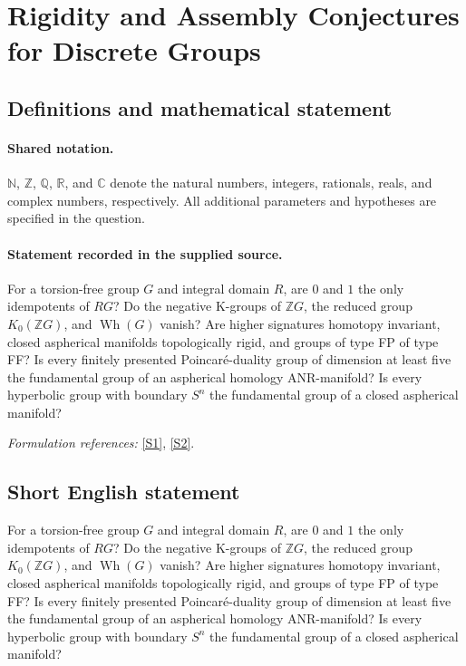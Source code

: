 \documentclass[11pt]{article}
\newcommand{\sref}[2]{\hyperlink{source:#1:#2}{[S#2]}}
\begin{document}
\section{Rigidity and Assembly Conjectures for Discrete Groups}\label{statement}

\subsection{Definitions and mathematical statement}

\paragraph{Shared notation.}$\mathbb N$, $\mathbb Z$, $\mathbb Q$, $\mathbb R$, and $\mathbb C$ denote the natural numbers, integers, rationals, reals, and complex numbers, respectively. All additional parameters and hypotheses are specified in the question.


\paragraph{Statement recorded in the supplied source.}
For a torsion-free group $G$ and integral domain $R$, are $0$ and $1$ the only idempotents of $RG$? Do the negative K-groups of $\mathbb{Z}G$, the reduced group $K_0(\mathbb{Z}G)$, and $\operatorname{Wh}(G)$ vanish? Are higher signatures homotopy invariant, closed aspherical manifolds topologically rigid, and groups of type FP of type FF? Is every finitely presented Poincaré-duality group of dimension at least five the fundamental group of an aspherical homology ANR-manifold? Is every hyperbolic group with boundary $S^n$ the fundamental group of a closed aspherical manifold?
\par\smallskip\textit{Formulation references:} \sref{statement}{1}, \sref{statement}{2}.
\subsection{Short English statement}
For a torsion-free group $G$ and integral domain $R$, are $0$ and $1$ the only idempotents of $RG$? Do the negative K-groups of $\mathbb{Z}G$, the reduced group $K_0(\mathbb{Z}G)$, and $\operatorname{Wh}(G)$ vanish? Are higher signatures homotopy invariant, closed aspherical manifolds topologically rigid, and groups of type FP of type FF? Is every finitely presented Poincaré-duality group of dimension at least five the fundamental group of an aspherical homology ANR-manifold? Is every hyperbolic group with boundary $S^n$ the fundamental group of a closed aspherical manifold?
\end{document}
